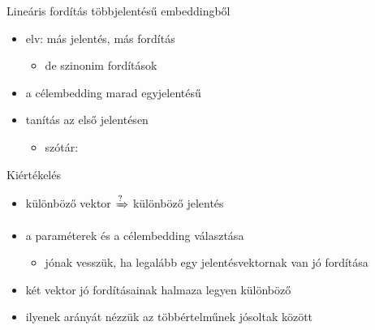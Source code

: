 \documentclass{beamer}
\newcommand{\bull}[1]{\begin{itemize}\item #1 \end{itemize}}
\begin{document}
\begin{frame}{Lineáris fordítás többjelentésű embeddingből}
  \begin{itemize}
    \item elv: más jelentés, más fordítás
      \bull{de szinonim fordítások}
    \item a célembedding marad egyjelentésű
      \citep{Pennington:2014,Mikolov:2013f}
    \item tanítás az első jelentésen 
      \bull{szótár: \citep{Acs:2013}}
  \end{itemize}
  \begin{figure}
    \centering
      \resizebox{\textwidth}{!} {
      }
  \end{figure}
\end{frame}
\begin{frame}[allowframebreaks]{Kiértékelés}
  \begin{itemize}
        \item  különböző vektor $\xRightarrow ?$ különböző jelentés
        \item a paraméterek és a célembedding választása
          \bull{jónak vesszük, ha legalább egy jelentésvektornak van jó
          fordítása}
        \item két vektor jó fordításainak halmaza legyen különböző
        \item ilyenek arányát nézzük az többértelműnek jósoltak között
  \end{itemize}
\end{frame}
\end{document}
